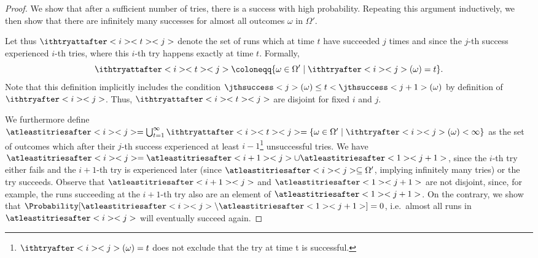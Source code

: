 \documentclass{article}
\newcommand{\unionSym}{\cup}
\newcommand{\unionBin}{\mathbin{\unionSym}}
\newcommand{\UnionSym}{\bigcup}
\newcommand{\union}{\unionBin}
\newcommand{\Union}{\UnionSym}
\begin{document}
\begin{proof}
	We show that after a sufficient number of tries, there is a success with high probability.
	Repeating this argument inductively, we then show that there are infinitely many successes for almost all outcomes $\omega$ in $\Omega'$.

	Let thus $\ithtryattafter<i><t><j>$ denote the set of runs which at time $t$ have succeeded $j$ times and since the $j$-th success experienced $i$-th tries, where this $i$-th try happens exactly at time $t$.
	Formally,
	\begin{equation*}
		\ithtryattafter<i><t><j> \coloneqq \{\omega \in \Omega' \mid \ithtryafter<i><j>(\omega) = t\}.
	\end{equation*}
	Note that this definition implicitly includes the condition $\jthsuccess<j>(\omega) \leq t < \jthsuccess<j+1>(\omega)$ by definition of $\ithtryafter<i><j>$.
	Thus, $\ithtryattafter<i><t><j>$ are disjoint for fixed $i$ and $j$.

	We furthermore define $\atleastitriesafter<i><j> = \Union_{t=1}^\infty \ithtryattafter<i><t><j> = \{\omega \in \Omega' \mid \ithtryafter<i><j>(\omega) < \infty\}$ as the set of outcomes which after their $j$-th success experienced at least $i - 1$\footnote{$\ithtryafter<i><j>(\omega) = t$ does not exclude that the try at time t is successful.} unsuccessful tries.
	We have $\atleastitriesafter<i><j> = \atleastitriesafter<i+1><j> \union \atleastitriesafter<1><j+1>$, since the $i$-th try either fails and the $i+1$-th try is experienced later (since $\atleastitriesafter<i><j> \subseteq \Omega'$, implying infinitely many tries) or the try succeeds.
	Observe that $\atleastitriesafter<i+1><j>$ and $\atleastitriesafter<1><j+1>$ are not disjoint, since, for example, the runs succeeding at the $i+1$-th try also are an element of $\atleastitriesafter<1><j+1>$.
	On the contrary, we show that $\Probability[\atleastitriesafter<i><j> \setminus \atleastitriesafter<1><j+1>] = 0$, i.e.\ almost all runs in $\atleastitriesafter<i><j>$ will eventually succeed again.

	\newcommand{\tryset}{\mathsf{Tries}}
	\newcommand{\successset}{\mathsf{Succs}}
	\newcommand{\trytime}{\mathsf{TryTime}}
	\newcommand{\successtime}{\mathsf{SuccTime}}
	\newcommand{\successruns}{\mathsf{SuccSet}}


\end{proof}
\end{document}
